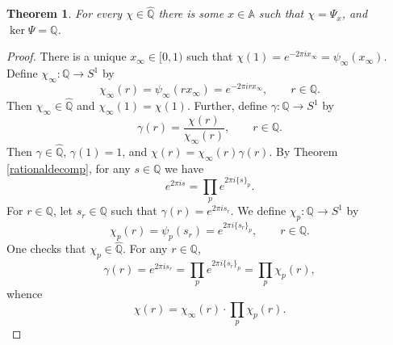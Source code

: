 \documentclass{article}
\newtheorem{theorem}{Theorem}
\theoremstyle{definition}
\begin{document}
\begin{theorem}
For every $\chi \in \widehat{\mathbb{Q}}$ there is some $x \in
\mathbb{A}$ such that $\chi=\Psi_x$, and $\ker \Psi=\mathbb{Q}$.
\end{theorem}
\begin{proof}
There is a unique $x_\infty \in [0,1)$ such that $\chi(1)=e^{-2\pi ix_\infty}=\psi_\infty(x_\infty)$. Define
$\chi_\infty:\mathbb{Q} \to S^1$ by
\[
\chi_\infty(r)=\psi_\infty(rx_\infty) = e^{-2\pi irx_\infty}, \qquad r \in \mathbb{Q}.
\]
Then $\chi_\infty \in \widehat{\mathbb{Q}}$ and $\chi_\infty(1)=\chi(1)$.  Further, define
$\gamma:\mathbb{Q} \to S^1$ by 
\[
\gamma(r) = \frac{\chi(r)}{\chi_\infty(r)}, \qquad r \in \mathbb{Q}.
\]
Then $\gamma \in \widehat{\mathbb{Q}}$, $\gamma(1)=1$,  and $\chi (r) = \chi_\infty(r) \gamma(r)$.
By
Theorem \ref{rationaldecomp}, for any $s \in \mathbb{Q}$ we have
\[
e^{2\pi is} = \prod_p e^{2\pi i\{s\}_p}.
\]
For $r \in \mathbb{Q}$, let $s_r \in \mathbb{Q}$ such that $\gamma(r) = e^{2\pi is_r}$. 
We define $\chi_p:\mathbb{Q} \to S^1$ by
\[
\chi_p(r) = \psi_p(s_r) = e^{2\pi i\{s_r\}_p}, \qquad r \in \mathbb{Q}.
\]
One checks that $\chi_p \in \widehat{\mathbb{Q}}$.
For any $r \in \mathbb{Q}$,
\[
\gamma(r)=e^{2\pi is_r} = \prod_p e^{2\pi i\{s_r\}_p} = 
\prod_p \chi_p(r),
\]
whence
\[
\chi(r) = \chi_\infty(r) \cdot \prod_p \chi_p(r).
\]


\end{proof}
\end{document}
